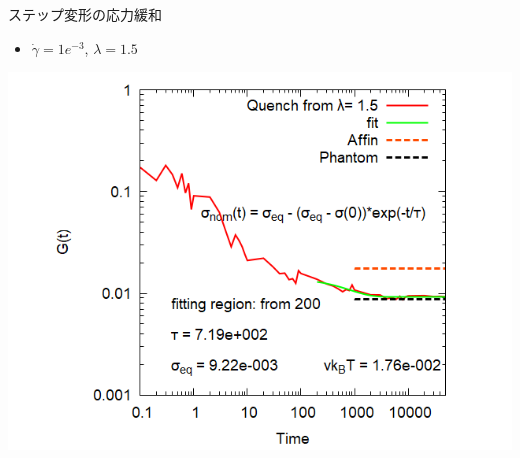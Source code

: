 \documentclass[aspectratio=169,11pt, dvipdfmx]{beamer}
\begin{document}
\begin{frame}
\begin{columns}[totalwidth=\linewidth]
\begin{exampleblock}{ステップ変形の応力緩和}
\begin{itemize}
                        \item $\dot{\gamma} = 1e^{-3}$, $\lambda = 1.5$
                    \end{itemize}
					\centering
                        \includegraphics[width=.78\columnwidth]{gt_sunuke.png}
				\end{exampleblock}
		\end{columns}
\end{frame}
\end{document}
